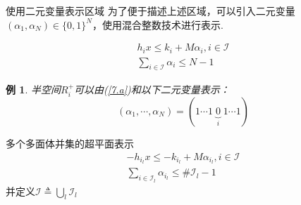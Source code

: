 \documentclass[notheorems,11pt]{beamer}
\theoremstyle{plain}
\numberwithin{theorem}{section}
\numberwithin{lemma}{section}
\numberwithin{corollary}{section}
\theoremstyle{example}
\newtheorem{example}{例}
\begin{document}
\begin{frame}{使用二元变量表示区域}
  为了便于描述上述区域，可以引入二元变量$(\alpha_1,\alpha_N)\in\{0,1\}^N$，使用混合整数技术进行表示.\par
  \begin{subequations}
    \label{7}
    \begin{gather}
      h_ix\leqslant k_i+M\alpha_i,i\in\mathcal{I} \label{7.a}\\
      \sum_{i\in\mathcal{I}}{\alpha_i}\leqslant N-1
    \end{gather}
  \end{subequations}
  \begin{example}
    半空间$R_i^+$可以由(\ref{7.a})和以下二元变量表示：
    \begin{equation}
      (\alpha_1,\cdots,\alpha_N)=\left(1\cdots 1\;\underbrace{0}_{i}\; 1\cdots 1\right)
    \end{equation}
  \end{example}
\end{frame}

\begin{frame}{多个多面体并集的超平面表示}
    \begin{subequations}
    \begin{gather}
      -h_{i_l}x\leqslant -k_{i_l}+M\alpha_{i_l},i\in\mathcal{I} \label{9.a}\\
      \sum_{i\in\mathcal{I}_l}{\alpha_{i_l}}\leqslant \#\mathcal{I}_l-1
    \end{gather}
  \end{subequations}
  并定义$\mathcal{I}\triangleq\bigcup_l{\mathcal{I}_l}$
\end{frame}
\end{document}
